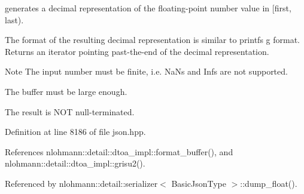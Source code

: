 generates a decimal representation of the floating-\/point number value in \mbox{[}first, last). 

The format of the resulting decimal representation is similar to printf\textquotesingle{}s g format. Returns an iterator pointing past-\/the-\/end of the decimal representation.

\begin{DoxyNote}{Note}
The input number must be finite, i.\+e. NaN\textquotesingle{}s and Inf\textquotesingle{}s are not supported. 

The buffer must be large enough. 

The result is N\+OT null-\/terminated. 
\end{DoxyNote}


Definition at line 8186 of file json.\+hpp.



References nlohmann\+::detail\+::dtoa\+\_\+impl\+::format\+\_\+buffer(), and nlohmann\+::detail\+::dtoa\+\_\+impl\+::grisu2().



Referenced by nlohmann\+::detail\+::serializer$<$ Basic\+Json\+Type $>$\+::dump\+\_\+float().


